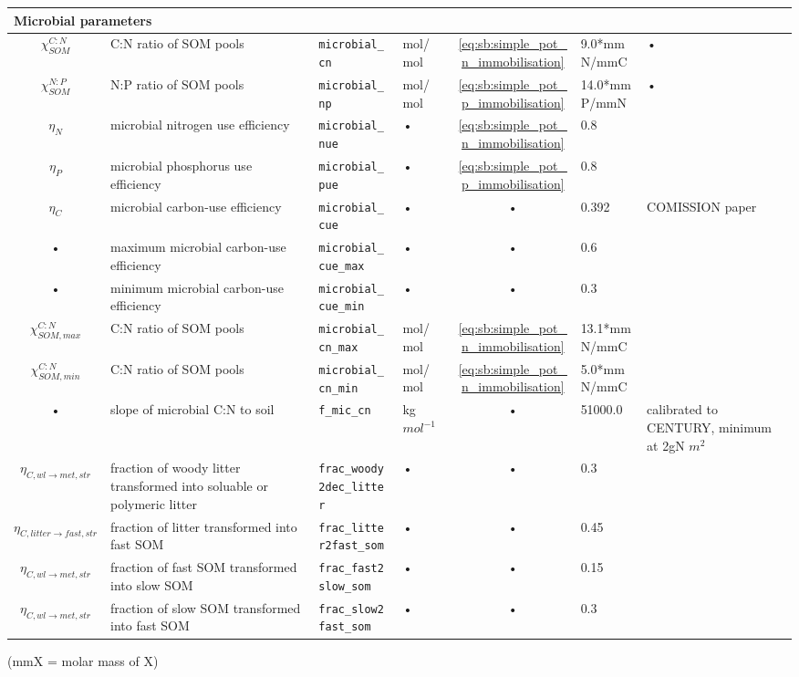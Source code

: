 \begin{table}
\begin{tabularx}{\linewidth}{|c|X|l|l|c|l|X|}
\multicolumn{6}{l}{\bf Microbial parameters}\\
\hline
$\chi_{SOM}^{C:N}$ & C:N ratio of SOM pools & \texttt{microbial\_cn} & mol/ mol & \ref{eq:sb:simple_pot_n_immobilisation} & 9.0*mmN/mmC & • \\
$\chi_{SOM}^{N:P}$ & N:P ratio of SOM pools & \texttt{microbial\_np} & mol/ mol & \ref{eq:sb:simple_pot_p_immobilisation} & 14.0*mmP/mmN & • \\
$\eta_{N}$ & microbial nitrogen use efficiency & \texttt{microbial\_nue} & • & \ref{eq:sb:simple_pot_n_immobilisation} & 0.8 & \cite{Manzoni:2008hw} \\
$\eta_{P}$ & microbial phosphorus use efficiency & \texttt{microbial\_pue} & • & \ref{eq:sb:simple_pot_p_immobilisation} & 0.8 & \cite{Manzoni:2008hw} \\
$\eta_{C}$ & microbial carbon-use efficiency & \texttt{microbial\_cue} & • & • & 0.392 & COMISSION paper \\
• & maximum microbial carbon-use efficiency & \texttt{microbial\_cue\_max} & • & • & 0.6 & \cite{Manzoni:2008hw} \\
• & minimum microbial carbon-use efficiency & \texttt{microbial\_cue\_min} & • & • & 0.3 & \cite{Manzoni:2008hw} \\
$\chi_{SOM,max}^{C:N}$ & C:N ratio of SOM pools & \texttt{microbial\_cn\_max} & mol/ mol & \ref{eq:sb:simple_pot_n_immobilisation} & 13.1*mmN/mmC & \cite{Manzoni:2008hw} \\
$\chi_{SOM,min}^{C:N}$ & C:N ratio of SOM pools & \texttt{microbial\_cn\_min} & mol/ mol & \ref{eq:sb:simple_pot_n_immobilisation} & 5.0*mmN/mmC & \cite{Manzoni:2008hw} \\
• & slope of microbial C:N to soil & \texttt{f\_mic\_cn} & kg $mol^{-1}$ & • & 51000.0 & calibrated to CENTURY, minimum at 2gN $m^{2}$ \\
$\eta_{C,wl \rightarrow met,str}$ & fraction of woody litter transformed into soluable or polymeric litter & \texttt{frac\_woody2dec\_litter} & • & • & 0.3 &  \cite{Parton:1993ud} \\
$\eta_{C,litter \rightarrow fast,str}$ & fraction of litter transformed into fast SOM & \texttt{frac\_litter2fast\_som} & • & • & 0.45 & \cite{Parton:1993ud} \\
$\eta_{C,wl \rightarrow met,str}$ & fraction of fast SOM transformed into slow SOM & \texttt{frac\_fast2slow\_som} & • & • & 0.15 & \cite{Parton:1993ud} \\
$\eta_{C,wl \rightarrow met,str}$ & fraction of slow SOM transformed into fast SOM & \texttt{frac\_slow2fast\_som} & • & • & 0.3 & \cite{Parton:1993ud} \\
\hline 
\end{tabularx}
(mmX = molar mass of X)
\end{table}



